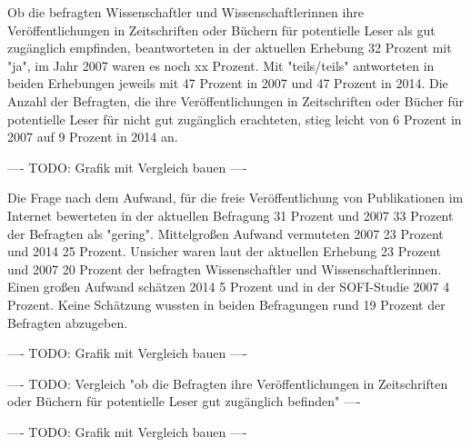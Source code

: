 Ob die befragten Wissenschaftler und Wissenschaftlerinnen ihre Veröffentlichungen in Zeitschriften oder Büchern für potentielle Leser als gut zugänglich empfinden, beantworteten in der aktuellen Erhebung 32 Prozent mit "ja", im Jahr 2007 waren es noch xx Prozent. Mit "teils/teils" antworteten in beiden Erhebungen jeweils mit 47 Prozent in 2007 und 47 Prozent in 2014. Die Anzahl der Befragten, die ihre Veröffentlichungen in Zeitschriften oder Bücher für potentielle Leser für nicht gut zugänglich erachteten, stieg leicht von 6 Prozent in 2007 auf 9 Prozent in 2014 an.

---- TODO: Grafik mit Vergleich bauen ----

Die Frage nach dem Aufwand, für die freie Veröffentlichung von Publikationen im Internet bewerteten in der aktuellen Befragung 31 Prozent und 2007 33 Prozent der Befragten als "gering". Mittelgroßen Aufwand vermuteten 2007 23 Prozent und 2014 25 Prozent. Unsicher waren laut der aktuellen Erhebung 23 Prozent und 2007 20 Prozent der befragten Wissenschaftler und Wissenschaftlerinnen. Einen großen Aufwand schätzen 2014 5 Prozent und in der SOFI-Studie 2007 4 Prozent. Keine Schätzung wussten in beiden Befragungen rund 19 Prozent der Befragten abzugeben.

---- TODO: Grafik mit Vergleich bauen ----

---- TODO: Vergleich "ob die Befragten ihre Veröffentlichungen in Zeitschriften oder Büchern für potentielle Leser gut zugänglich befinden" ----

---- TODO: Grafik mit Vergleich bauen ----
